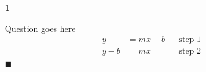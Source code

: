 \documentclass{article}
\newcommand{\qed}{\hfill$\blacksquare$}
\newenvironment{problem}[1]{
    \begin{enumerate}
        \item[\bfseries{#1}]
}
{
    \end{enumerate}
}
\begin{document}
\pagestyle{useheader}

\begin{problem}{1}
    Question goes here
    \begin{align*}
        y &= mx + b && \text{step 1}\\
        y - b &= mx && \text{step 2}\\
    \end{align*}
    \qed
\end{problem}
\end{document}
